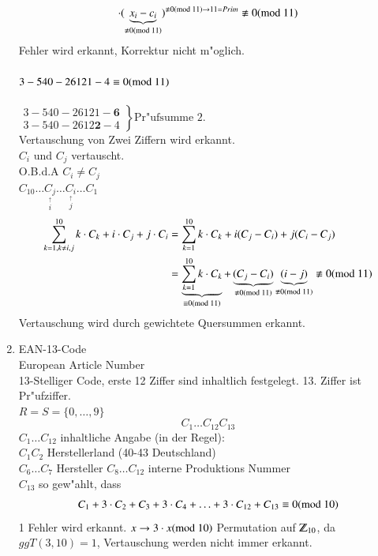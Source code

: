 \begin{enumerate}
\[{					\cdot (\underbrace{x_i-c_i}_{\nequiv 0 (\md{11})}) 
			}^{\nequiv 0 (\md{11})\rightarrow 11 = Prim}
			\nequiv 0(\md{11})	
		\]
		Fehler wird erkannt, Korrektur nicht m"oglich.\\
		\\
		$3-540-26121-4 \equiv 0(\text{mod }11)$\\ \\
		$\left.
		\begin{matrix}
			3-540-26121-\mathbf{6} \\
			3-540-2612\mathbf{2}-4
		\end{matrix}
		\right\} \text{Pr"ufsumme 2.}
		$\\
		Vertauschung von Zwei Ziffern wird erkannt.\\
		$C_i$ und $C_j$ vertauscht.\\
		O.B.d.A $C_i \neq C_j$\\
		$C_{10} \ldots \underset{\stackrel{\uparrow}{i}}{C_j} \ldots \underset{\stackrel{\uparrow}{j}}{C_i} \ldots C_1$\\
		\begin{align*}
			\sum^{10}_{k=1, k\neq i,j} k \cdot C_k + i \cdot 	C_j + j \cdot C_i
			&= \sum^{10}_{k=1} k \cdot C_k + i(C_j-C_i)+j(C_i-C_j)\\
			&= 
			\underbrace{\sum^{10}_{k=1} k \cdot C_k}_{\equiv 0 (\md{11})}
			 + 
			 \underbrace{(C_j-C_i)}_{\nequiv 0 (\md{11})}
			 \underbrace{(i-j)}_{\nequiv 0 (\md{11})}
			 \nequiv 0 (\md{11})
		\end{align*}
		Vertauschung wird durch gewichtete Quersummen erkannt.
\item EAN-13-Code\\
		European Article Number\\
		13-Stelliger Code, erste 12 Ziffer sind inhaltlich festgelegt. 13. Ziffer ist Pr"ufziffer.\\
		$R=S=\lbrace 0, \ldots, 9\rbrace$ \\
		\[C_1 \ldots C_{12} C_{13}\]
		$C_1 \ldots C_{12}$ inhaltliche Angabe (in der Regel):\\
		$C_1 C_2$ Herstellerland (40-43 Deutschland)\\
		$C_6 \ldots C_7$ Hersteller
		$C_8 \ldots C_{12}$ interne Produktions Nummer\\
		$C_{13}$ so gew"ahlt, dass
		\[
			C_1 + 3\cdot C_2 + C_3 + 3\cdot C_4 + \ldots + 3\cdot C_{12} + C_{13} \equiv 0 (\text{mod }10)
		\]
		1 Fehler wird erkannt. $x \rightarrow 3\cdot x (\text{mod }10)$ Permutation auf $\Z_{10}$, da $ggT(3,10)=1$, %
		Vertauschung werden nicht immer erkannt. \\

\end{enumerate}
